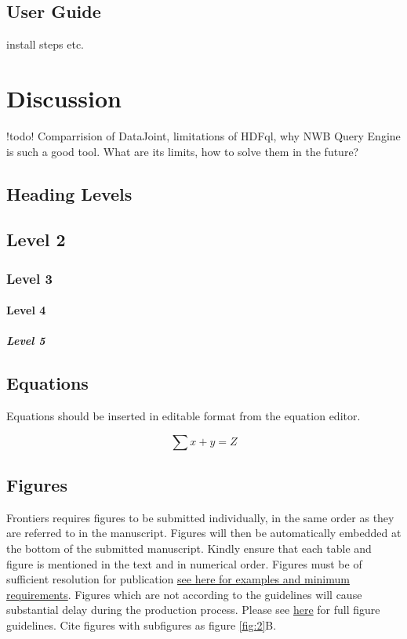 \documentclass[utf8]{frontiersSCNS} %
\begin{document}
\subsection{User Guide}
install steps etc.

\section{Discussion}
\label{Discussion}

!todo! Comparrision of DataJoint, limitations of HDFql, why NWB Query Engine is such a good tool. What are its limits, how to solve them in the future?

\subsection{Heading Levels}


\subsection{Level 2}
\subsubsection{Level 3}
\paragraph{Level 4}
\subparagraph{Level 5}

\subsection{Equations}
Equations should be inserted in editable format from the equation editor.

\begin{equation}
\sum x+ y =Z\label{eq:01}
\end{equation}

\subsection{Figures}
Frontiers requires figures to be submitted individually, in the same order as they are referred to in the manuscript. Figures will then be automatically embedded at the bottom of the submitted manuscript. Kindly ensure that each table and figure is mentioned in the text and in numerical order. Figures must be of sufficient resolution for publication \href{http://home.frontiersin.org/about/author-guidelines#ResolutionRequirements}{see here for examples and minimum requirements}. Figures which are not according to the guidelines will cause substantial delay during the production process. Please see \href{http://home.frontiersin.org/about/author-guidelines#GeneralStyleGuidelinesforFigures}{here} for full figure guidelines. Cite figures with subfigures as figure \ref{fig:2}B.
\end{document}
